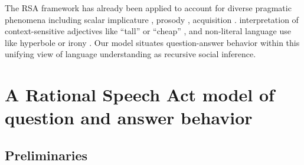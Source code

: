 \documentclass[12pt, floatsintext, jou]{apa6}
\begin{document}
The RSA framework has already been applied to account for diverse pragmatic phenomena including scalar implicature \cite{GoodmanStuhlmuller13_KnowledgeImplicature}, prosody \cite{BergenGoodman15_StrategicUseOfNoise},
acquisition \cite{FrankGoodman14_InferringWordMeanings}. 
interpretation of context-sensitive adjectives like ``tall'' or ``cheap'' \cite{LassiterGoodman15_AdjectivalVagueness}, and
non-literal language use like hyperbole \cite{KaoWuBergenGoodman14_NonliteralNumberWords} or irony \cite{KaoGoodman15_IronyCogSci}.
Our model situates question-answer behavior within this unifying view of language understanding as recursive social inference.

\section{A Rational Speech Act model of question and answer behavior}
\label{sec:model}

\subsection{Preliminaries}
\end{document}
